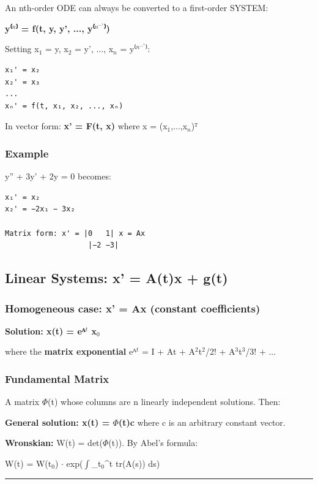 \documentclass[12pt,a4paper,openany]{book}
\begin{document}
{{An nth-order ODE can always be converted to a first-order SYSTEM:

\textbf{y⁽$^n$⁾ = f(t, y, y', ..., y⁽$^n^{-}^1$⁾)}

Setting x$_1$ = y, x$_2$ = y', ..., x$_n$ = y⁽$^n^{-}^1$⁾:

\begin{verbatim}
x₁' = x₂
x₂' = x₃
...
xₙ' = f(t, x₁, x₂, ..., xₙ)
\end{verbatim}

In vector form: \textbf{x' = F(t, x)} where x = (x$_1$,...,x$_n$)ᵀ

\subsubsection{Example}
y'' + 3y' + 2y = 0 becomes:

\begin{verbatim}
x₁' = x₂
x₂' = −2x₁ − 3x₂

Matrix form: x' = |0   1| x = Ax
                   |−2 −3|
\end{verbatim}

\subsection{Linear Systems: x' = A(t)x + g(t)}

\subsubsection{Homogeneous case: x' = Ax (constant coefficients)}

\textbf{Solution: x(t) = eᴬ$^t$ x$_0$}

where the \textbf{matrix exponential} eᴬ$^t$ = I + At + A$^2$t$^2$/2! + A$^3$t$^3$/3! + ...

\subsubsection{Fundamental Matrix}
A matrix $\Phi$(t) whose columns are n linearly independent solutions. Then:

\textbf{General solution: x(t) = $\Phi$(t)c} where c is an arbitrary constant vector.

\textbf{Wronskian:} W(t) = det($\Phi$(t)). By Abel's formula:

W(t) = W(t$_0$) $\cdot$ exp($\int$_{t$_0$}^{t} tr(A(s)) ds)

\bigskip\noindent\rule{\textwidth}{0.4pt}\bigskip

}}
\end{document}
